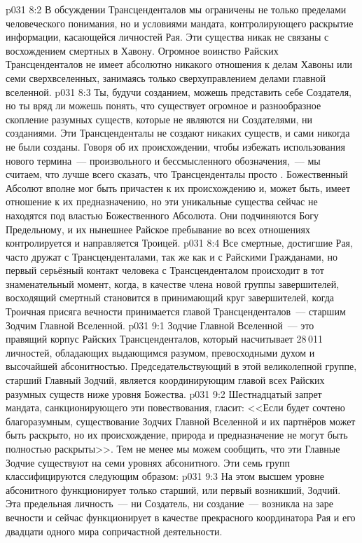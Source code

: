 \vs p031 8:2 В обсуждении Трансценденталов мы ограничены не только пределами человеческого понимания, но и условиями мандата, контролирующего раскрытие информации, касающейся личностей Рая. Эти существа никак не связаны с восхождением смертных в Хавону. Огромное воинство Райских Трансценденталов не имеет абсолютно никакого отношения к делам Хавоны или семи сверхвселенных, занимаясь только сверхуправлением делами главной вселенной.
\vs p031 8:3 Ты, будучи созданием, можешь представить себе Создателя, но ты вряд ли можешь понять, что существует огромное и разнообразное скопление разумных существ, которые не являются ни Создателями, ни созданиями. Эти Трансценденталы не создают никаких существ, и сами никогда не были созданы. Говоря об их происхождении, чтобы избежать использования нового термина~--- произвольного и бессмысленного обозначения,~--- мы считаем, что лучше всего сказать, что Трансценденталы просто . Божественный Абсолют вполне мог быть причастен к их происхождению и, может быть, имеет отношение к их предназначению, но эти уникальные существа сейчас не находятся под властью Божественного Абсолюта. Они подчиняются Богу Предельному, и их нынешнее Райское пребывание во всех отношениях контролируется и направляется Троицей.
\vs p031 8:4 Все смертные, достигшие Рая, часто дружат с Трансценденталами, так же как и с Райскими Гражданами, но первый серьёзный контакт человека с Трансценденталом происходит в тот знаменательный момент, когда, в качестве члена новой группы завершителей, восходящий смертный становится в принимающий круг завершителей, когда Троичная присяга вечности принимается главой Трансценденталов~--- старшим Зодчим Главной Вселенной.
\vs p031 9:1 Зодчие Главной Вселенной~--- это правящий корпус Райских Трансценденталов, который насчитывает 28\,011 личностей, обладающих выдающимся разумом, превосходными духом и высочайшей абсонитностью. Председательствующий в этой великолепной группе, старший Главный Зодчий, является координирующим главой всех Райских разумных существ ниже уровня Божества.
\vs p031 9:2 Шестнадцатый запрет мандата, санкционирующего эти повествования, гласит: <<Если будет сочтено благоразумным, существование Зодчих Главной Вселенной и их партнёров может быть раскрыто, но их происхождение, природа и предназначение не могут быть полностью раскрыты>>. Тем не менее мы можем сообщить, что эти Главные Зодчие существуют на семи уровнях абсонитного. Эти семь групп классифицируются следующим образом:
\vs p031 9:3  На этом высшем уровне абсонитного функционирует только старший, или первый возникший, Зодчий. Эта предельная личность~--- ни Создатель, ни создание~--- возникла на заре вечности и сейчас функционирует в качестве прекрасного координатора Рая и его двадцати одного мира сопричастной деятельности.
